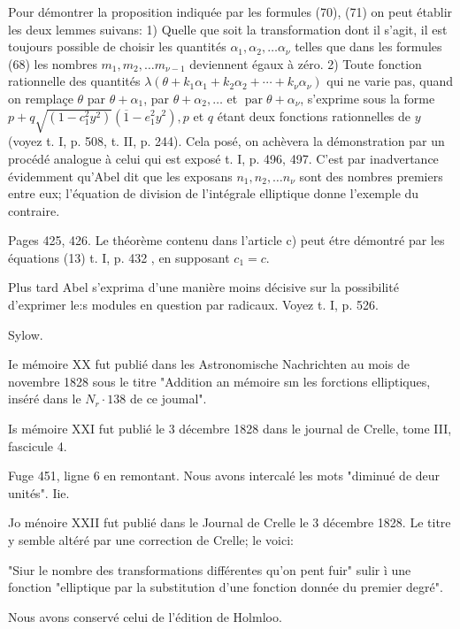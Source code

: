 \documentclass{article}
\begin{document}
Pour démontrer la proposition indiquée par les formules (70), (71) on peut établir les deux lemmes suivans: 1) Quelle que soit la transformation dont il s'agit, il est toujours possible de choisir les quantités \(\alpha_{1}, \alpha_{2}, \ldots \alpha_{\nu}\) telles que dans les formules (68) les nombres \(m_{1}, m_{2}, \ldots m_{\nu-1}\) deviennent égaux à zéro. 2) Toute fonction rationnelle des quantités \(\lambda\left(\theta+k_{1} \alpha_{1}+k_{2} \alpha_{2}+\cdots+k_{\nu} \alpha_{\nu}\right)\) qui ne varie pas, quand on
remplaçe \(\theta\) par \(\theta+\alpha_{1}\), par \(\theta+\alpha_{2}, \ldots\) et \(\operatorname{par} \theta+\alpha_{\nu}\), s'exprime sous la forme \(p+q \sqrt{\left(1-c_{1}^{2} y^{2}\right)}\left(\overline{1}-e_{1}^{2} y^{2}\right), p\) et \(q\) étant deux fonctions rationnelles de \(y\) (voyez t. I, p. 508, t. II, p. 244). Cela posé, on achèvera la démonstration par un procédé analogue à celui qui est exposé t. I, p. 496, 497. C'est par inadvertance évidemment qu'Abel dit que les exposans \(n_{1}, n_{2}, \ldots n_{\nu}\) sont des nombres premiers entre eux; l'équation de division de l'intégrale elliptique donne l'exemple du contraire.

Pages 425, 426. Le théorème contenu dans l'article c) peut étre démontré par les équations (13) t. I, p. 432 , en supposant \(c_{1}=c\).

Plus tard Abel s'exprima d'une manière moins décisive sur la possibilité d'exprimer le:s modules en question par radicaux. Voyez t. I, p. 526.

Sylow.

Ie mémoire XX fut publié dans les Astronomische Nachrichten au mois de novembre 1828 sous le titre "Addition an mémoire sın les forctions elliptiques, inséré dans le \(N_{r} \cdot 138\) de ce joumal".

Is mémoire XXI fut publié le 3 décembre 1828 dans le journal de Crelle, tome III, fascicule 4.

Fuge 451, ligne 6 en remontant. Nous avons intercalé les mots "diminué de deur unités". Iie.

Jo ménoire XXII fut publié dans le Journal de Crelle le 3 décembre 1828. Le titre y semble altéré par une correction de Crelle; le voici:

"Siur le nombre des transformations différentes qu'on pent fuir" sulir ì une fonction "elliptique par la substitution d'une fonction donnée du premier degré".

Nous avons conservé celui de l'édition de Holmloo.
\end{document}
